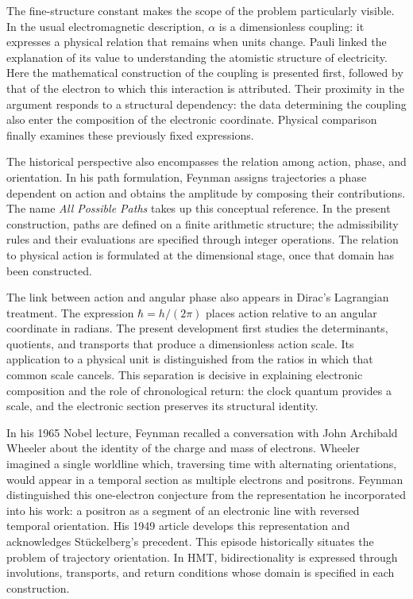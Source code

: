 



The fine-structure constant makes the scope of the
problem particularly visible. In the usual electromagnetic description, \(\alpha\) is a
dimensionless coupling: it expresses a physical relation that remains when
units change. Pauli linked the explanation of its value to
understanding the atomistic structure of electricity\cite{pauli1946}.
Here the mathematical construction of the coupling is presented first,
followed by that of the electron to which this interaction is attributed. Their proximity
in the argument responds to a structural dependency: the data
determining the coupling also enter the composition of the
electronic coordinate. Physical comparison finally examines these
previously fixed expressions.

The historical perspective also encompasses the relation among action, phase,
and orientation. In his path formulation, Feynman assigns trajectories
a phase dependent on action and obtains the amplitude by
composing their contributions\cite{feynman1948}. The name
\emph{All Possible Paths} takes up this conceptual reference. In the present
construction, paths are defined on a finite arithmetic structure;
the admissibility rules and their evaluations are specified through
integer operations. The relation to physical action is formulated at the
dimensional stage, once that domain has been constructed.

The link between action and angular phase also appears in
Dirac's Lagrangian treatment\cite{dirac1933}. The expression \(\hbar=h/(2\pi)\)
places action relative to an angular coordinate in radians. The present development
first studies the determinants, quotients, and transports that
produce a dimensionless action scale. Its application to a physical
unit is distinguished from the ratios in which that common scale cancels.
This separation is decisive in explaining electronic composition
and the role of chronological return: the clock quantum provides a
scale, and the electronic section preserves its structural identity.

In his 1965 Nobel lecture, Feynman recalled a conversation with
John Archibald Wheeler about the identity of the charge and mass of
electrons\cite{feynman1965}. Wheeler imagined a single worldline
which, traversing time with alternating orientations, would appear in a
temporal section as multiple electrons and positrons. Feynman distinguished
this one-electron conjecture from the representation he incorporated into
his work: a positron as a segment of an electronic line with reversed temporal
orientation. His 1949 article develops this representation and
acknowledges Stückelberg's precedent\cite{feynman1949}. This episode
historically situates the problem of trajectory orientation. In HMT,
bidirectionality is expressed through involutions, transports, and
return conditions whose domain is specified in each construction.

